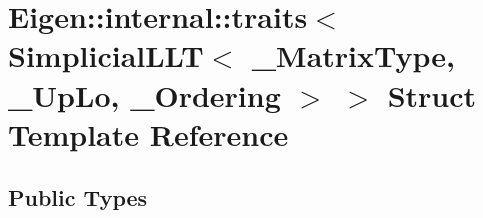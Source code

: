 \hypertarget{struct_eigen_1_1internal_1_1traits_3_01_simplicial_l_l_t_3_01___matrix_type_00_01___up_lo_00_01___ordering_01_4_01_4}{}\section{Eigen\+:\+:internal\+:\+:traits$<$ Simplicial\+L\+LT$<$ \+\_\+\+Matrix\+Type, \+\_\+\+Up\+Lo, \+\_\+\+Ordering $>$ $>$ Struct Template Reference}
\label{struct_eigen_1_1internal_1_1traits_3_01_simplicial_l_l_t_3_01___matrix_type_00_01___up_lo_00_01___ordering_01_4_01_4}
\subsection*{Public Types}
